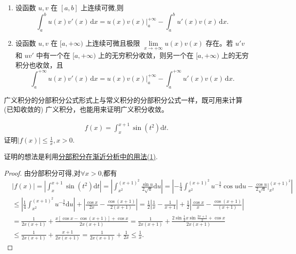 \documentclass[../../main.tex]{subfiles}
\begin{document}
\begin{theorem}[分部积分公式]\label{theorem:分部积分公式}
\begin{enumerate}
\item 设函数 \( u, v \) 在 \([a, b]\) 上连续可微,则
\[
\int_a^b{u\left( x \right) v' \left( x \right) \,\mathrm{d}x}=u\left( x \right) v\left( x \right) \Big|_{a}^{+\infty}-\int_a^b{u'\left( x \right) v\left( x \right) \,\mathrm{d}x}.
\]

\item 设函数 \( u, v \) 在 \([a, +\infty)\) 上连续可微且极限 \( \lim\limits_{x \to +\infty} u(x)v(x) \) 存在。若 \( u'v \) 和 \( uv' \) 中有一个在 \([a, +\infty)\) 上的无穷积分收敛，则另一个在 \([a, +\infty)\) 上的无穷积分也收敛，且
\[
\int_a^{+\infty} u(x)v'(x) \, \mathrm{d}x = u(x)v(x) \Big |_a^{+\infty} - \int_a^{+\infty} u'(x)v(x) \, \mathrm{d}x.
\]
\end{enumerate}
\end{theorem}
\begin{remark}
广义积分的分部积分公式形式上与常义积分的分部积分公式一样，既可用来计算 (已知收敛的) 广义积分，也能用来证明广义积分收敛。
\end{remark}

\begin{example}
\begin{align*}
f\left( x \right) =\int_x^{x+1}{\sin \left( t^2 \right) \mathrm{d}t}.
\end{align*}
证明$\left| f\left( x \right) \right|\le \frac{1}{x},x>0$.
\end{example}
\begin{note}
证明的想法是利用\hyperref[分部积分在渐近分析中的用法(1)]{分部积分在渐近分析中的用法(1)}.
\end{note}
\begin{proof}
由分部积分可得,对$\forall x>0$,都有
\begin{align*}
&\left| f\left( x \right) \right|=\left| \int_x^{x+1}{\sin \left( t^2 \right) \mathrm{d}t} \right|=\left| \int_{x^2}^{\left( x+1 \right) ^2}{\frac{\sin u}{2\sqrt{u}}\mathrm{d}u} \right|=\left| -\frac{1}{4}\int_{x^2}^{\left( x+1 \right) ^2}{u^{-\frac{3}{2}}\cos u\mathrm{d}u}-\frac{\cos u}{2\sqrt{u}}\Big|_{x^2}^{\left( x+1 \right) ^2} \right|
\\
&\leqslant \left| \frac{1}{4}\int_{x^2}^{\left( x+1 \right) ^2}{u^{-\frac{3}{2}}\mathrm{d}u} \right|+\left| \frac{\cos x}{2x}-\frac{\cos \left( x+1 \right)}{2\left( x+1 \right)} \right|=\frac{1}{2}\left| \frac{1}{x}-\frac{1}{x+1} \right|+\frac{1}{2}\left| \frac{\cos x}{x}-\frac{\cos \left( x+1 \right)}{\left( x+1 \right)} \right|
\\
&=\frac{1}{2x\left( x+1 \right)}+\frac{x\left[ \cos x-\cos \left( x+1 \right) \right] +\cos x}{2x\left( x+1 \right)}=\frac{1}{2x\left( x+1 \right)}+\frac{2\sin \frac{1}{2}x\sin \frac{2x+1}{2}+\cos x}{2x\left( x+1 \right)}
\\
&\le \frac{1}{2x\left( x+1 \right)}+\frac{x+1}{2x\left( x+1 \right)}=\frac{1}{2x\left( x+1 \right)}+\frac{1}{2x}\leqslant \frac{1}{x}.
\end{align*}
\end{proof}
\end{document}
